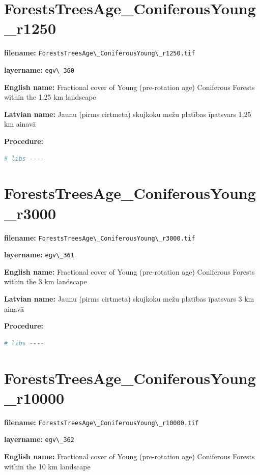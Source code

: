 \documentclass[
]{book}
\newcommand{\passthrough}[1]{#1}
\begin{document}
\section{ForestsTreesAge\_ConiferousYoung\_r1250}\label{ch06.360}

\textbf{filename:} \passthrough{\lstinline!ForestsTreesAge\_ConiferousYoung\_r1250.tif!}

\textbf{layername:} \passthrough{\lstinline!egv\_360!}

\textbf{English name:} Fractional cover of Young (pre-rotation age) Coniferous Forests within the 1.25 km landscape

\textbf{Latvian name:} Jaunu (pirms cirtmeta) skujkoku mežu platības īpatsvars 1,25 km ainavā

\textbf{Procedure:}

\begin{lstlisting}[language=R]
# libs ----
\end{lstlisting}

\section{ForestsTreesAge\_ConiferousYoung\_r3000}\label{ch06.361}

\textbf{filename:} \passthrough{\lstinline!ForestsTreesAge\_ConiferousYoung\_r3000.tif!}

\textbf{layername:} \passthrough{\lstinline!egv\_361!}

\textbf{English name:} Fractional cover of Young (pre-rotation age) Coniferous Forests within the 3 km landscape

\textbf{Latvian name:} Jaunu (pirms cirtmeta) skujkoku mežu platības īpatsvars 3 km ainavā

\textbf{Procedure:}

\begin{lstlisting}[language=R]
# libs ----
\end{lstlisting}

\section{ForestsTreesAge\_ConiferousYoung\_r10000}\label{ch06.362}

\textbf{filename:} \passthrough{\lstinline!ForestsTreesAge\_ConiferousYoung\_r10000.tif!}

\textbf{layername:} \passthrough{\lstinline!egv\_362!}

\textbf{English name:} Fractional cover of Young (pre-rotation age) Coniferous Forests within the 10 km landscape
\end{document}
